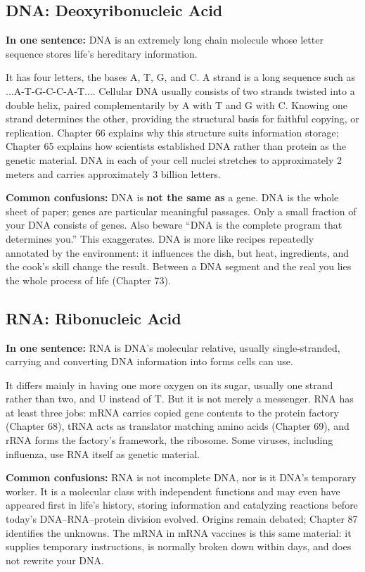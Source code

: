 \subsection{DNA: Deoxyribonucleic Acid}

\textbf{In one sentence:} DNA is an extremely long chain molecule whose letter sequence stores life's hereditary information.

It has four letters, the bases A, T, G, and C. A strand is a long sequence such as ...A-T-G-C-C-A-T.... Cellular DNA usually consists of two strands twisted into a double helix, paired complementarily by A with T and G with C. Knowing one strand determines the other, providing the structural basis for faithful copying, or replication. Chapter 66 explains why this structure suits information storage; Chapter 65 explains how scientists established DNA rather than protein as the genetic material. DNA in each of your cell nuclei stretches to approximately 2 meters and carries approximately 3 billion letters.

\textbf{Common confusions:} DNA is \textbf{not the same as} a gene. DNA is the whole sheet of paper; genes are particular meaningful passages. Only a small fraction of your DNA consists of genes. Also beware ``DNA is the complete program that determines you.'' This exaggerates. DNA is more like recipes repeatedly annotated by the environment: it influences the dish, but heat, ingredients, and the cook's skill change the result. Between a DNA segment and the real you lies the whole process of life (Chapter 73).

\subsection{RNA: Ribonucleic Acid}

\textbf{In one sentence:} RNA is DNA's molecular relative, usually single-stranded, carrying and converting DNA information into forms cells can use.

It differs mainly in having one more oxygen on its sugar, usually one strand rather than two, and U instead of T. But it is not merely a messenger. RNA has at least three jobs: mRNA carries copied gene contents to the protein factory (Chapter 68), tRNA acts as translator matching amino acids (Chapter 69), and rRNA forms the factory's framework, the ribosome. Some viruses, including influenza, use RNA itself as genetic material.

\textbf{Common confusions:} RNA is not incomplete DNA, nor is it DNA's temporary worker. It is a molecular class with independent functions and may even have appeared first in life's history, storing information and catalyzing reactions before today's DNA--RNA--protein division evolved. Origins remain debated; Chapter 87 identifies the unknowns. The mRNA in mRNA vaccines is this same material: it supplies temporary instructions, is normally broken down within days, and does not rewrite your DNA.

